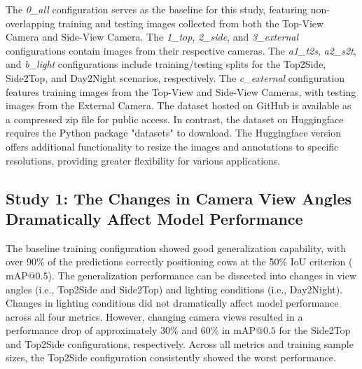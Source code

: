 The \textit{0\_all} configuration serves as the baseline for this study, featuring non-overlapping training and testing images collected from both the Top-View Camera and Side-View Camera. The \textit{1\_top}, \textit{2\_side}, and \textit{3\_external} configurations contain images from their respective cameras. The \textit{a1\_t2s}, \textit{a2\_s2t}, and \textit{b\_light} configurations include training/testing splits for the Top2Side, Side2Top, and Day2Night scenarios, respectively. The \textit{c\_external} configuration features training images from the Top-View and Side-View Cameras, with testing images from the External Camera. The dataset hosted on GitHub is available as a compressed zip file for public access. In contrast, the dataset on Huggingface requires the Python package "datasets" \cite{datasets} to download. The Huggingface version offers additional functionality to resize the images and annotations to specific resolutions, providing greater flexibility for various applications.

\subsection{Study 1: The Changes in Camera View Angles Dramatically Affect Model Performance}
The baseline training configuration showed good generalization capability, with over 90\% of the predictions correctly positioning cows at the 50\% IoU criterion ($\text{mAP@{0.5}}$). The generalization performance can be dissected into changes in view angles (i.e., Top2Side and Side2Top) and lighting conditions (i.e., Day2Night). Changes in lighting conditions did not dramatically affect model performance across all four metrics. However, changing camera views resulted in a performance drop of approximately 30\% and 60\% in $\text{mAP@{0.5}}$ for the Side2Top and Top2Side configurations, respectively. Across all metrics and training sample sizes, the Top2Side configuration consistently showed the worst performance.

